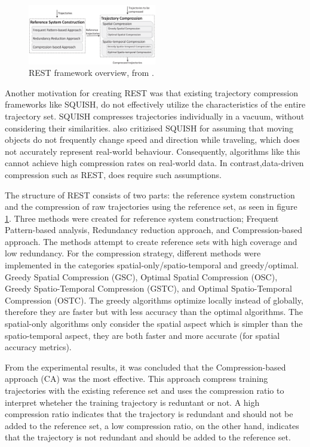 \begin{figure}
    \includegraphics[width=0.5\textwidth]{./figures/rest_structure.png}
    \caption{REST framework overview, from \cite{zhao2018rest}.}
    \label{fig:rest_overview}
\end{figure}

Another motivation for creating REST was that existing trajectory compression frameworks like SQUISH, do not effectively utilize the characteristics of the entire trajectory set. SQUISH compresses trajectories individually in a vacuum, without considering their similarities. \cite{zhao2018rest} also critizised SQUISH for assuming that moving objects do not frequently change speed and direction while traveling, which does not accurately represent real-world behaviour. Consequently, algorithms like this cannot achieve high compression rates on real-world data. In contrast,data-driven compression such as REST, does require such assumptions.

The structure of REST consists of two parts: the reference system construction and the compression of raw trajectories using the reference set, as seen in figure \ref*{fig:rest_overview}. Three methods were created for reference system construction; Frequent Pattern-based analysis, Redundancy reduction approach, and Compression-based approach. The methods attempt to create reference sets with high coverage and low redundancy. For the compression strategy, different methods were implemented in the categories spatial-only/spatio-temporal and greedy/optimal. Greedy Spatial Compression (GSC), Optimal Spatial Compression (OSC), Greedy Spatio-Temporal Compression (GSTC), and Optimal Spatio-Temporal Compression (OSTC). The greedy algorithms optimize locally instead of globally, therefore they are faster but with less accuracy than the optimal algorithms. The spatial-only algorithms only consider the spatial aspect which is simpler than the spatio-temporal aspect, they are both faster and more accurate (for spatial accuracy metrics).

From the experimental results, it was concluded that the Compression-based approach (CA) was the most effective. This approach compress training trajectories with the existing reference set and uses the compression ratio to interpret wheteher the training trajectory is reduntant or not. A high compression ratio indicates that the trajectory is redundant and should not be added to the reference set, a low compression ratio, on the other hand, indicates that the trajectory is not redundant and should be added to the reference set.

